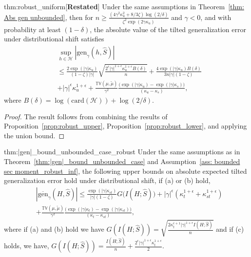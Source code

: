 \documentclass{article}
\theoremstyle{plain}
\theoremstyle{plain}
\theoremstyle{definition}
\theoremstyle{remark}
\newcommand{\nn}{\nonumber}
\begin{document}
\begin{tcolorbox}
  \begin{reptheorem}{thm:robust_uniform}[\textbf{Restated}]
      Under the same assumptions in Theorem~\ref{thm: Abs gen unbounded}, then for $n\geq \frac{(4\gamma^2\kappa_u^2+8/3 \zeta )\log(2/\delta)}{\zeta^2\exp(2\gamma \kappa_u)}$ and $\gamma<0$, and with probability at least $(1-\delta)$, the absolute value of the tilted generalization error under distributional shift satisfies
  \begin{align}
            &\sup_{h\in\mathcal{H}}|\mathrm{gen}_{\gamma}(h,\hat{S})|\\\nn&\leq \frac{2\exp(|\gamma| \kappa_u)}{(1-\zeta)|\gamma|}\sqrt{\frac{2^{\epsilon}|\gamma|^{1+\epsilon}\kappa_u^{1+\epsilon}B(\delta)}{n}} +\frac{4\exp(|\gamma| \kappa_u)B(\delta)}{3n|\gamma|(1-\zeta)}\nn\\& \nn +|\gamma|^{\epsilon}\kappa_u^{1+\epsilon}+\frac{\mathbb{TV}(\mu,\tilde{\mu})}{\gamma^2 }\frac{\big(\exp(|\gamma|\kappa_u)-\exp(|\gamma|\kappa_s)\big)}{(\kappa_u-\kappa_s)},
        \end{align}
  where  $B(\delta)= \log(\mathrm{card}(\mathcal{H}))+\log(2/\delta)$.
  \end{reptheorem}  
\end{tcolorbox}
\begin{proof}
    The result follows from combining the results of Proposition~\ref{prop:robust_upper}, Proposition~\ref{prop:robust_lower}, and applying the union bound.
\end{proof}
    \begin{reptheorem}{thm:|gen|_bound_unbounded_case_robust}
Under the same assumptions as in Theorem~\ref{thm:|gen|_bound_unbounded_case} and Assumption~\ref{ass: bounded sec moment_robust_inf},
    the following upper bounds on absolute expected tilted generalization error hold under distributional shift, if (a) or (b) hold,
    \begin{equation*}
    \begin{split}
        &|\overline{\mathrm{gen}}_{\gamma}(H,\hat{S})|\leq \frac{\exp(|\gamma| \kappa_{st})}{|\gamma|(1-\zeta)} G\big(I(H;\hat{S})\big)+|\gamma|^\epsilon(\kappa_t^{1+\epsilon}+\kappa_{st}^{1+\epsilon})\\&+\frac{\mathbb{TV}(\mu,\tilde{\mu})}{\gamma^2 }\frac{\Big(\exp(|\gamma|\kappa_t)-\exp(|\gamma|\kappa_{st})\Big)}{(\kappa_t-\kappa_{st})},
    \end{split}
    \end{equation*}
    where if (a) and (b) hold we have $G(I(H;\hat S))=\sqrt{\frac{2\kappa_t^{\epsilon+1} |\gamma|^{1+\epsilon} I(H;\hat S)}{n}}$ and if (c) holds, we have, $G(I(H;\hat S))=\frac{ I(H;\hat S)}{n}+\frac{2^{\epsilon}|\gamma|^{1+\epsilon} \kappa_t^{1+\epsilon}}{2}$.
\end{reptheorem}
\end{document}
